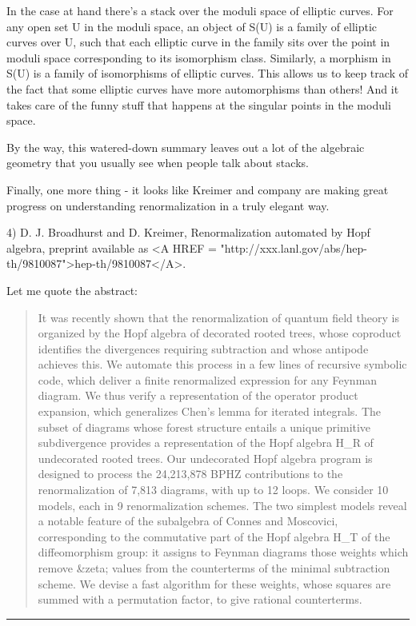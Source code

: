 In the case at hand there's a stack over the moduli space of elliptic
curves.  For any open set U in the moduli space, an object of S(U) is a
family of elliptic curves over U, such that each elliptic curve in the
family sits over the point in moduli space corresponding to its
isomorphism class.  Similarly, a morphism in S(U) is a family of
isomorphisms of elliptic curves.  This allows us to keep track of the
fact that some elliptic curves have more automorphisms than others!  And
it takes care of the funny stuff that happens at the singular points in
the moduli space.

By the way, this watered-down summary leaves out a lot of the
algebraic geometry that you usually see when people talk about stacks.

Finally, one more thing - it looks like Kreimer and company are making
great progress on understanding renormalization in a truly elegant way. 

4) D. J. Broadhurst and D. Kreimer, Renormalization automated by Hopf algebra,
preprint available as 
<A HREF = "http://xxx.lanl.gov/abs/hep-th/9810087">hep-th/9810087</A>.  


Let me quote the abstract:

\begin{quote}
It was recently shown that the renormalization of quantum field theory
is organized by the Hopf algebra of decorated rooted trees, whose
coproduct identifies the divergences requiring subtraction and whose
antipode achieves this. We automate this process in a few lines of
recursive symbolic code, which deliver a finite renormalized expression
for any Feynman diagram. We thus verify a representation of the operator
product expansion, which generalizes Chen's lemma for iterated
integrals. The subset of diagrams whose forest structure entails a
unique primitive subdivergence provides a representation of the Hopf
algebra H_{R} of undecorated rooted trees. Our undecorated Hopf algebra
program is designed to process the 24,213,878 BPHZ contributions to the
renormalization of 7,813 diagrams, with up to 12 loops. We consider 10
models, each in 9 renormalization schemes. The two simplest models
reveal a notable feature of the subalgebra of Connes and Moscovici,
corresponding to the commutative part of the Hopf algebra H_{T} of the
diffeomorphism group: it assigns to Feynman diagrams those weights which
remove &zeta; values from the counterterms of the minimal subtraction
scheme. We devise a fast algorithm for these weights, whose squares are
summed with a permutation factor, to give rational counterterms.
\end{quote}



 \par\noindent\rule{\textwidth}{0.4pt}

